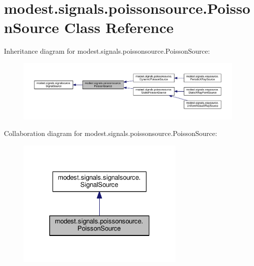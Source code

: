 \hypertarget{classmodest_1_1signals_1_1poissonsource_1_1PoissonSource}{}\section{modest.\+signals.\+poissonsource.\+Poisson\+Source Class Reference}
\label{classmodest_1_1signals_1_1poissonsource_1_1PoissonSource}


Inheritance diagram for modest.\+signals.\+poissonsource.\+Poisson\+Source\+:\nopagebreak
\begin{figure}[H]
\begin{center}
\leavevmode
\includegraphics[width=350pt]{classmodest_1_1signals_1_1poissonsource_1_1PoissonSource__inherit__graph}
\end{center}
\end{figure}


Collaboration diagram for modest.\+signals.\+poissonsource.\+Poisson\+Source\+:\nopagebreak
\begin{figure}[H]
\begin{center}
\leavevmode
\includegraphics[width=232pt]{classmodest_1_1signals_1_1poissonsource_1_1PoissonSource__coll__graph}
\end{center}
\end{figure}
